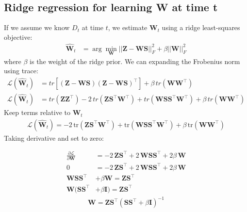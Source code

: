 \documentclass[11pt,letterpaper]{article} %
\begin{document}
\subsection*{Ridge regression for learning W at time t}
If we assume we know $D_t$ at time $t$, we estimate $\mathbf{W}_t$ using a ridge least-squares objective:
\begin{align*}
\hat{\mathbf{W}}_t &= \arg\min_{\mathbf{W}}
||\mathbf{Z-WS}||_F^2 + \beta||\mathbf{W}||_F^2
\end{align*}
where $\beta$ is the weight of the ridge prior. We can expanding the Frobenius norm using trace:
\begin{align*}
\mathcal{L}(\hat{\mathbf{W}}_t) &= tr[(\mathbf{Z-WS})(\mathbf{Z-WS})^{\top}]+\beta \,tr(\mathbf{WW}^{\top})\\
\mathcal{L}(\hat{\mathbf{W}}_t)&=tr(\mathbf{ZZ}^{\top})
- 2\,tr(\mathbf{ZS^{\top}W^{\top}}) + tr(\mathbf{WSS^{\top}W^{\top}})
+ \beta \,tr(\mathbf{WW}^{\top})
\end{align*}
Keep terms relative to $\mathbf{W}_t$
\begin{align*}
\mathcal{L}(\hat{\mathbf{W}}_t)= -2\,\mathrm{tr}(\mathbf{ZS}^{\top}\mathbf{W}^{\top})
+ \mathrm{tr}(\mathbf{WSS^{\top}W^{\top}})
+ \beta \,\mathrm{tr}(\mathbf{WW}^{\top})
\end{align*}
Taking derivative and set to zero:

\begin{align*}
\frac{\partial \mathcal{L}}{\partial \mathbf{W}} &= -2\,\mathbf{ZS}^{\top}
+ 2\,\mathbf{WSS}^{\top}
+ 2\beta\,\mathbf{W}\\
0 &= -2\,\mathbf{ZS}^{\top} + 2\,\mathbf{WSS}^{\top}+ 2\beta\,\mathbf{W}\\
\mathbf{WSS}^{\top} &+ \beta \mathbf{W} = \mathbf{ZS}^{\top}\\
\mathbf{W}(\mathbf{SS}^{\top} &+ \beta \mathbf{I}) = \mathbf{ZS}^{\top}
\end{align*}
\begin{align*}
\boxed{\mathbf{W}=\mathbf{ZS}^{\top}(\mathbf{SS}^{\top}+\beta \mathbf{I})^{-1}}
\end{align*}
\end{document}
